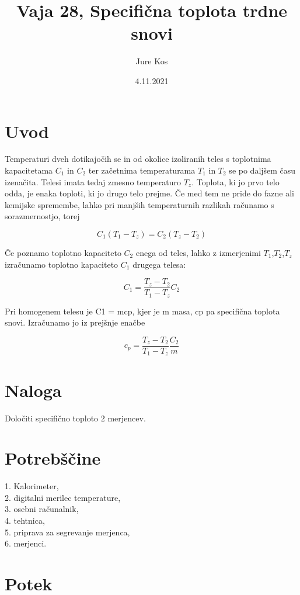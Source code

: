 \documentclass[a4paper]{article}
\title{Vaja 28, Specifična toplota trdne snovi}
\author{Jure Kos}
\date{4.11.2021}
\begin{document}
\maketitle

\section{Uvod}

Temperaturi dveh dotikajočih se in od okolice izoliranih teles s toplotnima kapacitetama $C_1$ in $C_2$ ter začetnima temperaturama $T_1$ in $T_2$ se po daljšem času izenačita. Telesi imata tedaj zmesno temperaturo $T_z$. Toplota, ki jo prvo telo odda, je enaka toploti, ki jo drugo telo prejme. Če med tem ne pride do fazne ali kemijske spremembe, lahko pri manjših temperaturnih razlikah računamo s sorazmernostjo, torej

\[C_1(T_1-T_z)=C_2(T_z-T_2)\]

Če poznamo toplotno kapaciteto $C_2$ enega od teles, lahko z izmerjenimi $T_1$,$T_2$,$T_z$ izračunamo toplotno kapaciteto $C_1$ drugega telesa:

\[C_1= \frac{T_z-T_2}{T_1-T_z}C_2\]

Pri homogenem telesu je C1 = mcp, kjer je m masa, cp pa specifična toplota snovi. Izračunamo jo iz prejšnje enačbe

\[c_p=\frac{T_z-T_2}{T_1-T_z}\frac{C_2}{m}\]


\section{Naloga}

Določiti specifično toploto 2 merjencev.



\section{Potrebščine}


1. Kalorimeter, \\
2. digitalni merilec temperature, \\
3. osebni računalnik, \\
4. tehtnica, \\
5. priprava za segrevanje merjenca, \\
6. merjenci. \\


\section{Potek}
\end{document}
